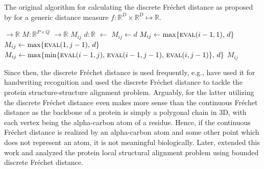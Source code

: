 \begin{algorithm}
    \caption{The original algorithm for calculating the discrete Fr\'echet distance as proposed by \citet{eiter94} for a generic distance measure $f: \mathbb{R}^D \times \mathbb{R}^D \mapsto \mathbb{R}$.}
    \label{alg:vanilla}
    \begin{algorithmic}[1]
         $\to \mathbb{R}$
            \State $M: \mathbb{R}^{P \times Q}$ \label{alg:vanilla:M}
            \Statex
             $\to \mathbb{R}$
                    \State \Return $M_{ij}$
                \EndIf
                \Statex
                \State $d: \mathbb{R}$ $\gets$ 
                 \label{alg:vanilla:if1}
                    \State $M_{ij} \gets d$
                 \label{alg:vanilla:if2}
                    \State $M_{ij} \gets \max\{\Call{eval}{i - 1, 1},\, d\}$
                 \label{alg:vanilla:if3}
                    \State $M_{ij} \gets \max\{\Call{eval}{1, j - 1},\, d\}$
                \Else \label{alg:vanilla:if4}
                    \State $M_{ij} \gets \max\{\min\{\Call{eval}{i - 1, j},\, \Call{eval}{i - 1, j - 1},\, \Call{eval}{i, j - 1}\},\, d\}$
                \EndIf
                \Statex
                \State \Return $M_{ij}$
            \EndFunction
            \Statex
            \State \Return {}
        \EndFunction
    \end{algorithmic}
\end{algorithm}

Since then, the discrete Fr\'echet distance is used frequently, e.g., \citet{sriraghavendra07} have used it for handwriting recognition and \citet{jiang08} used the discrete Fr\'echet distance to tackle the protein structure-structure alignment problem.
Arguably, for the latter utilizing the discrete Fr\'echet distance even makes more sense than the continuous Fr\'echet distance as the backbone of a protein is simply a polygonal chain in 3D, with each vertex being the alpha-carbon atom of a residue.
Hence, if the continuous Fr\'echet distance is realized by an alpha-carbon atom and some other point which does not represent an atom, it is not meaningful biologically.
Later, \citet{zhu07} extended this work and analyzed the protein local structural alignment problem using bounded discrete Fr\'echet distance.

